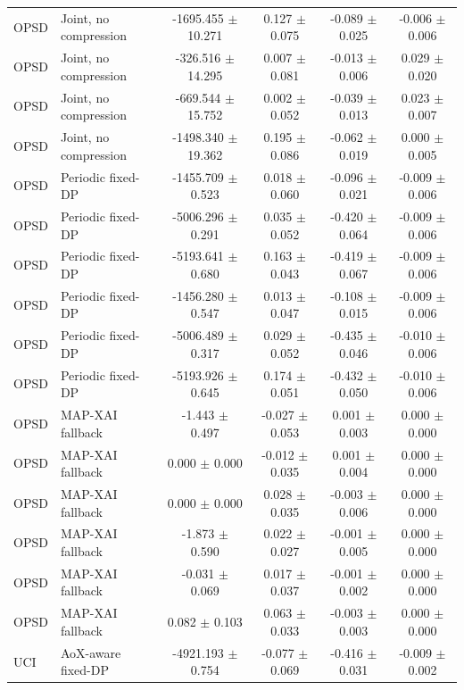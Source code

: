 \begin{table}[t]
\begin{tabular}{llcccc}
OPSD & Joint, no compression & -1695.455 $\pm$ 10.271 & 0.127 $\pm$ 0.075 & -0.089 $\pm$ 0.025 & -0.006 $\pm$ 0.006 \\
OPSD & Joint, no compression & -326.516 $\pm$ 14.295 & 0.007 $\pm$ 0.081 & -0.013 $\pm$ 0.006 & 0.029 $\pm$ 0.020 \\
OPSD & Joint, no compression & -669.544 $\pm$ 15.752 & 0.002 $\pm$ 0.052 & -0.039 $\pm$ 0.013 & 0.023 $\pm$ 0.007 \\
OPSD & Joint, no compression & -1498.340 $\pm$ 19.362 & 0.195 $\pm$ 0.086 & -0.062 $\pm$ 0.019 & 0.000 $\pm$ 0.005 \\
OPSD & Periodic fixed-DP & -1455.709 $\pm$ 0.523 & 0.018 $\pm$ 0.060 & -0.096 $\pm$ 0.021 & -0.009 $\pm$ 0.006 \\
OPSD & Periodic fixed-DP & -5006.296 $\pm$ 0.291 & 0.035 $\pm$ 0.052 & -0.420 $\pm$ 0.064 & -0.009 $\pm$ 0.006 \\
OPSD & Periodic fixed-DP & -5193.641 $\pm$ 0.680 & 0.163 $\pm$ 0.043 & -0.419 $\pm$ 0.067 & -0.009 $\pm$ 0.006 \\
OPSD & Periodic fixed-DP & -1456.280 $\pm$ 0.547 & 0.013 $\pm$ 0.047 & -0.108 $\pm$ 0.015 & -0.009 $\pm$ 0.006 \\
OPSD & Periodic fixed-DP & -5006.489 $\pm$ 0.317 & 0.029 $\pm$ 0.052 & -0.435 $\pm$ 0.046 & -0.010 $\pm$ 0.006 \\
OPSD & Periodic fixed-DP & -5193.926 $\pm$ 0.645 & 0.174 $\pm$ 0.051 & -0.432 $\pm$ 0.050 & -0.010 $\pm$ 0.006 \\
OPSD & MAP-XAI fallback & -1.443 $\pm$ 0.497 & -0.027 $\pm$ 0.053 & 0.001 $\pm$ 0.003 & 0.000 $\pm$ 0.000 \\
OPSD & MAP-XAI fallback & 0.000 $\pm$ 0.000 & -0.012 $\pm$ 0.035 & 0.001 $\pm$ 0.004 & 0.000 $\pm$ 0.000 \\
OPSD & MAP-XAI fallback & 0.000 $\pm$ 0.000 & 0.028 $\pm$ 0.035 & -0.003 $\pm$ 0.006 & 0.000 $\pm$ 0.000 \\
OPSD & MAP-XAI fallback & -1.873 $\pm$ 0.590 & 0.022 $\pm$ 0.027 & -0.001 $\pm$ 0.005 & 0.000 $\pm$ 0.000 \\
OPSD & MAP-XAI fallback & -0.031 $\pm$ 0.069 & 0.017 $\pm$ 0.037 & -0.001 $\pm$ 0.002 & 0.000 $\pm$ 0.000 \\
OPSD & MAP-XAI fallback & 0.082 $\pm$ 0.103 & 0.063 $\pm$ 0.033 & -0.003 $\pm$ 0.003 & 0.000 $\pm$ 0.000 \\
UCI & AoX-aware fixed-DP & -4921.193 $\pm$ 0.754 & -0.077 $\pm$ 0.069 & -0.416 $\pm$ 0.031 & -0.009 $\pm$ 0.002 \\

\end{tabular}
\end{table}
